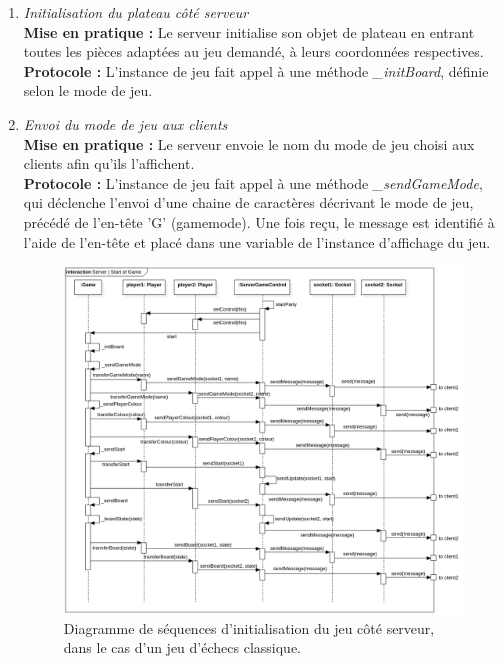 \documentclass[10pt, a4paper]{article}
\begin{document}
\begin{enumerate}

\item \textit{Initialisation du plateau côté serveur}\\
\textbf{Mise en pratique :} Le serveur initialise son objet de plateau en entrant toutes les pièces adaptées au jeu demandé, à leurs coordonnées respectives.\\
\textbf{Protocole :} L'instance de jeu fait appel à une méthode \textit{\_initBoard}, définie selon le mode de jeu.

\item \textit{Envoi du mode de jeu aux clients}\\
\textbf{Mise en pratique :} Le serveur envoie le nom du mode de jeu choisi aux clients afin qu'ils l'affichent.\\
\textbf{Protocole :} L'instance de jeu fait appel à une méthode \textit{\_sendGameMode}, qui déclenche l'envoi d'une chaine de caractères décrivant le mode de jeu, précédé de l'en-tête 'G' (gamemode). Une fois reçu, le message est identifié à l'aide de l'en-tête et placé dans une variable de l'instance d'affichage du jeu.

\begin{figure} [ht]
\centering
\includegraphics[scale=0.40]{Sequence_Server_GameStart.png}
\caption{Diagramme de séquences d'initialisation du jeu côté serveur, dans le cas d'un jeu d'échecs classique.}
\end{figure}


\end{enumerate}
\end{document}
